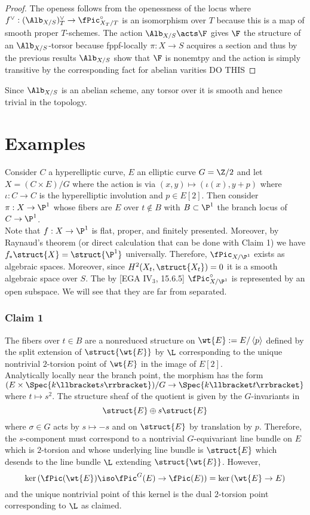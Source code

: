 \documentclass[12pt]{article}
\begin{document}
\begin{proof}
The openess follows from the openessness of the locus where $f^\vee : (\Alb_{X/S})_T^\vee \to \fPic^\circ_{X_T/T}$ is an isomorphism over $T$ because this is a map of smooth proper $T$-schemes. The action $\Alb_{X/S} \acts \F$ gives $\F$ the structure of an $\Alb_{X/S}$-torsor because fppf-locally $\pi :X \to S$ acquires a section and thus by the previous results $\Alb_{X/S}$ show that $\F$ is nonemtpy and the action is simply transitive by the corresponding fact for abelian varities {\color{red} DO THIS}
\end{proof}

Since $\Alb_{X/S}$ is an abelian scheme, any torsor over it is smooth and hence trivial in the \etale topology.

\section{Examples}

Consider $C$ a hyperelliptic curve, $E$ an elliptic curve $G = \Z/2$ and let $X = (C \times E)/G$ where the action is via $(x,y) \mapsto (\iota(x), y + p)$ where $\iota : C \to C$ is the hyperelliptic involution and $p \in E[2]$. Then consider $\pi : X \to \P^1$ whose fibers are $E$ over $t \notin B$ with $B \subset \P^1$ the branch locus of $C \to \P^1$. 
\bigskip\\
Note that $f : X \to \P^1$ is flat, proper, and finitely presented. Moreover, by Raynaud's theorem (or direct calculation that can be done with Claim 1) we have $f_* \struct{X} = \struct{\P^1}$ universally. Therefore, $\fPic_{X/\P^1}$ exists as algebraic spaces. Moreover, since $H^2(X_t, \struct{X_t}) = 0$ it is a smooth algebraic space over $S$. The by [EGA IV$_3$, 15.6.5] $\fPic_{X/\P^1}^\circ$ is represented by an open subspace. We will see that they are far from separated.

\subsubsection{Claim 1}

\newcommand{\br}[1]{\llbracket #1 \rrbracket}

The fibers over $t \in B$ are a nonreduced structure on $\wt{E} := E / \left< p \right>$ defined by the split extension of $\struct{\wt{E}}$ by $\L$ corresponding to the unique nontrivial $2$-torsion point of $\wt{E}$ in the image of $E[2]$.
\bigskip\\
Analytically locally near the branch point, the morphism has the form $(E \times \Spec{k\br{s}})/G \to \Spec{k\br{t}}$ where $t \mapsto s^2$. The structure sheaf of the quotient is given by the $G$-invariants in
\[ \struct{E} \oplus s \struct{E} \]
where $\sigma \in G$ acts by $s \mapsto -s$ and on $\struct{E}$ by translation by $p$. Therefore, the $s$-component must correspond to a nontrivial $G$-equivariant line bundle on $E$ which is $2$-torsion and whose underlying line bundle is $\struct{E}$ which desends to the line bundle $\L$ extending $\struct{\wt{E}}$. However, 
\[ \ker{(\fPic(\wt{E}) \iso \fPic^G(E) \to \fPic(E))} = \ker{(\wt{E} \to E)} \]  
and the unique nontrivial point of this kernel is the dual $2$-torsion point corresponding to $\L$ as claimed.
\end{document}
